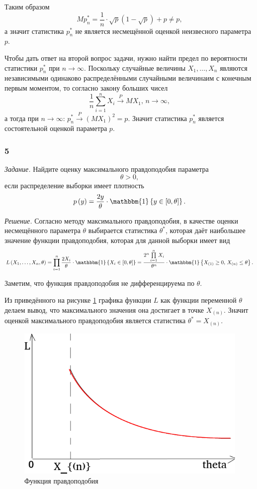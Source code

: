 Таким образом
$$Mp_n^* =
  \frac{1}{n} \cdot \sqrt{p} \left( 1 - \sqrt{p} \right) + p \neq
  p,$$
а значит статистика $p_n^*$ не является несмещённой оценкой неизвесного параметра $p$.

Чтобы дать ответ на второй вопрос задачи,
нужно найти предел по вероятности статистики $p_n^*$ при $n \to \infty $.
Поскольку случайные величины $X_1, \dotsc, X_n$
являются независимыми одинаково распределёнными случайными величинаим с конечным первым моментом,
то согласно закону больших чисел
$$ \frac{1}{n} \sum \limits_{i = 1}^n X_i \overset{P}{ \rightarrow } MX_1, \,
  n \to \infty,$$
а тогда при $n \to \infty: \, p_n^* \overset{P}{ \rightarrow } \left( MX_1 \right)^2 = p$.
Значит статистика $p_n^*$ является состоятельной оценкой параметра $p$.


\subsubsection*{5}

\textit{Задание.}
Найдите оценку максимального правдоподобия параметра
$$ \theta >
  0,$$
если распределение выборки имеет плотность
$$p \left( y \right) =
  \frac{2y}{ \theta } \cdot \mathbbm{1} \left\{ y \in \left[ 0, \theta \right] \right\}.$$

\textit{Решение.} Согласно методу максимального правдоподобия,
в качестве оценки несмещённого параметра $ \theta $ выбирается статистика $ \theta^*$,
которая даёт наибольшее значение функции правдоподобия, которая для данной выборки имеет вид
$$L \left( X_1, \dotsc, X_n, \theta \right) =
  \prod \limits_{i = 1}^n
    \frac{2X_i}{ \theta } \cdot \mathbbm{1} \left\{ X_i \in \left[ 0, \theta \right] \right\} =
  \frac{2^n \prod \limits_{i = 1}^n X_i}{ \theta^{n}} \cdot
  \mathbbm{1}
    \left\{ X_{ \left( 1 \right) } \geq 0, \, X_{ \left( n \right) } \leq \theta \right\}.$$

Заметим, что функция правдоподобия не дифференцируема по $ \theta $.

Из  приведённого на рисунке \ref{fig:5} графика функции $L$ как функции переменной $ \theta $
делаем вывод, что максимального значения она достигает в точке $X_{ \left( n \right) }$.
Значит оценкой максимального правдоподобия является статистика $ \theta^* = X_{ \left( n \right) }$.

\begin{figure}[h!]
  \centering
  \includegraphics[width=.4\textwidth]{./pictures/v1_5.png}
  \caption{Функция правдоподобия}
  \label{fig:5}
\end{figure}
